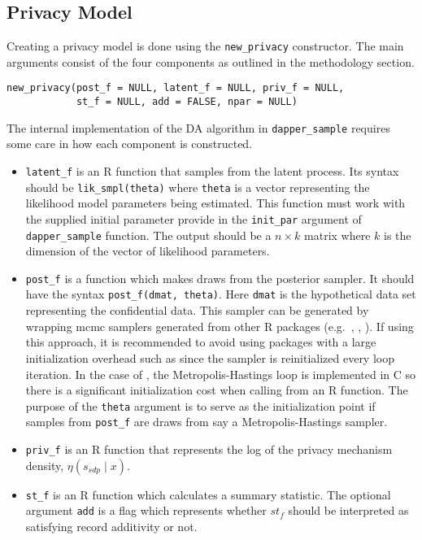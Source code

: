 \hypertarget{privacy-model}{%
\subsection{Privacy Model}\label{privacy-model}}

Creating a privacy model is done using the \texttt{new\_privacy} constructor. The
main arguments consist of the four components as outlined in the methodology
section.

\begin{verbatim}
new_privacy(post_f = NULL, latent_f = NULL, priv_f = NULL,
            st_f = NULL, add = FALSE, npar = NULL)
\end{verbatim}

The internal implementation of the DA algorithm in \texttt{dapper\_sample} requires
some care in how each component is constructed.

\begin{itemize}
\item
  \texttt{latent\_f} is an R function that samples from the latent process. Its
  syntax should be \texttt{lik\_smpl(theta)} where \texttt{theta} is a vector
  representing the likelihood model parameters being estimated. This function
  must work with the supplied initial parameter provide in the \texttt{init\_par}
  argument of \texttt{dapper\_sample} function. The output should be a \(n \times k\) matrix
  where \(k\) is the dimension of the vector of likelihood parameters.
\item
  \texttt{post\_f} is a function which makes draws from the posterior sampler. It should
  have the syntax \texttt{post\_f(dmat,\ theta)}. Here \texttt{dmat} is the
  hypothetical data set representing the confidential data. This sampler can be generated by wrapping mcmc samplers generated from other R packages
  (e.g.~, , ).
  If using this approach, it is recommended to avoid using packages
  with a large initialization overhead such as  since the sampler is reinitialized
  every loop iteration. In the case of ,
  the Metropolis-Hastings loop is implemented in C so there is a significant initialization cost
  when calling from an R function. The purpose of the \texttt{theta} argument is
  to serve as the initialization point if samples from \texttt{post\_f} are draws
  from say a Metropolis-Hastings sampler.
\item
  \texttt{priv\_f} is an R function that represents the log of the privacy mechanism density, \(\eta(s_{sdp} \mid x)\).
\item
  \texttt{st\_f} is an R function which calculates a summary statistic. The optional
  argument \texttt{add} is a flag which represents whether \(st_f\) should be interpreted as
  satisfying record additivity or not.
\end{itemize}

